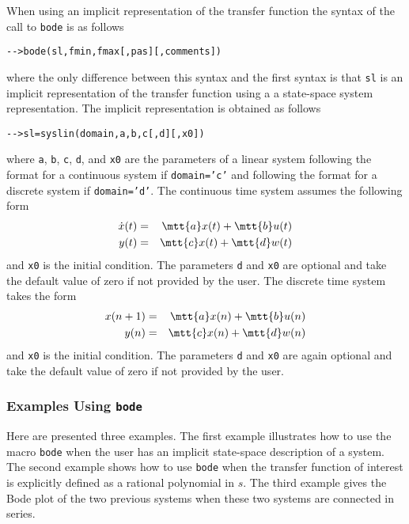 	When using an implicit representation of the transfer function
the syntax of the call to {\tt bode} is as follows
\begin{verbatim}
-->bode(sl,fmin,fmax[,pas][,comments])
\end{verbatim}
where the only difference between this syntax and 
the first syntax is that {\tt sl}
is an implicit representation of the transfer function using a
a state-space system representation.  The implicit representation is
obtained as follows
\begin{verbatim}
-->sl=syslin(domain,a,b,c[,d][,x0])
\end{verbatim}
where {\tt a}, {\tt b}, {\tt c}, {\tt d}, and {\tt x0} are the parameters
of a linear system following the format for a continuous system
if {\tt domain='c'} and following the format for a discrete system
if {\tt domain='d'}.  The continuous time system assumes the following
form
%
\begin{eqnarray}
\dot{x}(t)&=&\mtt{a}x(t)+\mtt{b}u(t)\nonumber\\
y(t)&=&\mtt{c}x(t)+\mtt{d}w(t)\nonumber
\end{eqnarray}
%
and {\tt x0} is the initial condition.  The parameters {\tt d} and {\tt x0}
are optional and take the default value of zero if not provided by the user.
The discrete time system takes the form
%
\begin{eqnarray}
x(n+1)&=&\mtt{a}x(n)+\mtt{b}u(n)\nonumber\\
y(n)&=&\mtt{c}x(n)+\mtt{d}w(n)\nonumber
\end{eqnarray}
%
and {\tt x0} is the initial condition.  The parameters {\tt d} and {\tt x0}
are again optional and take the default value of zero if not provided 
by the user.

\subsubsection{Examples Using {\tt bode}}

	Here are presented three examples.  The first example
illustrates how to use the macro {\tt bode} when the user has
an implicit state-space description of a system.
The second example shows how to use {\tt bode} when the transfer
function of interest is explicitly defined as a rational polynomial
in $s$.  The third example gives the Bode plot of the two previous
systems when these two systems are connected in series.

